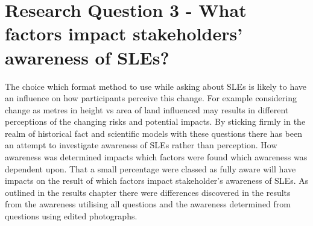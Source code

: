 \section{Research Question 3 - What factors impact stakeholders' awareness of SLEs? }
The choice which format method to use while asking about SLEs is likely to have an influence on how participants perceive this change. For example considering change as metres in height vs area of land influenced may results in different perceptions of the changing risks and potential impacts.  By sticking firmly in the realm of historical fact and scientific models with these questions there has been an attempt to investigate awareness of SLEs rather than perception. How awareness was determined impacts which factors were found which awareness was dependent upon. That a small percentage were classed as fully aware will have impacts on the result of which factors impact stakeholder's awareness of SLEs. As outlined in the results chapter there were differences discovered in the results from the awareness utilising all questions and the awareness determined from questions using edited photographs. 
\paragraph{}


